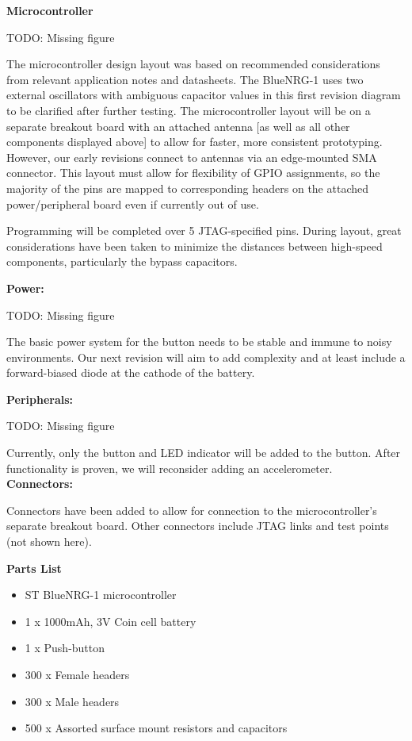 \documentclass[journal,compsoc]{IEEEtran}
\begin{document}
\textbf {Microcontroller}

TODO: Missing figure

The microcontroller design layout was based on recommended considerations from relevant application notes and datasheets.  The BlueNRG-1 uses two external oscillators with ambiguous capacitor values in this first revision diagram to be clarified after further testing.  The microcontroller layout will be on a separate breakout board with an attached antenna [as well as all other components displayed above] to allow for faster, more consistent prototyping.  However, our early revisions connect to antennas via an edge-mounted SMA connector.  This layout must allow for flexibility of GPIO assignments, so the majority of the pins are mapped to corresponding headers on the attached power/peripheral board even if currently out of use.

Programming will be completed over 5 JTAG-specified pins.  During layout, great considerations have been taken to minimize the distances between high-speed components, particularly the bypass capacitors.

\textbf {Power:}

TODO: Missing figure

The basic power system for the button needs to be stable and immune to noisy environments.  Our next revision will aim to add complexity and at least include a forward-biased diode at the cathode of the battery.

\textbf {Peripherals:}

TODO: Missing figure

Currently, only the button and LED indicator will be added to the button.  After functionality is proven, we will reconsider adding an accelerometer.\\

\textbf {Connectors:}

Connectors have been added to allow for connection to the microcontroller’s separate breakout board.  Other connectors include JTAG links and test points (not shown here).

\textbf {Parts List}

\begin{itemize}
  \item ST BlueNRG-1 microcontroller
  \item 1 x 1000mAh, 3V Coin cell battery
  \item 1 x Push-button
  \item 300 x Female headers
  \item 300 x Male headers
  \item 500 x Assorted surface mount resistors and capacitors
\end{itemize}
\end{document}
